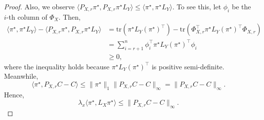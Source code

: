 \documentclass{article}
\theoremstyle{definition}
\begin{document}
\begin{proof}
    Also, we observe $\langle P_{X, r} \pi^\star, P_{X, r} \pi^\star L_Y \rangle \le \langle \pi^\star, \pi^\star L_Y \rangle$. To see this, let $\phi_i$ be the $i$-th column of $\Phi_X$. Then,
    \begin{equation*}
        \begin{split}
            \langle \pi^\star, \pi^\star L_Y \rangle - \langle P_{X, r} \pi^\star, P_{X, r} \pi^\star L_Y \rangle 
            & = \mathrm{tr}(\pi^\star L_Y (\pi^\star)^\top) - \mathrm{tr}(\Phi_{X, r}^\top \pi^\star L_Y (\pi^\star)^\top \Phi_{X, r}) \\
            & = \sum_{i = r + 1}^{n} \phi_i^\top \pi^\star L_Y (\pi^\star)^\top \phi_i \\
            & \ge 0,
        \end{split}
    \end{equation*}
    where the inequality holds because $\pi^\star L_Y (\pi^\star)^\top$ is positive semi-definite. Meanwhile, 
    \begin{equation*}
        \langle \pi^\star, P_{X, r} C - C \rangle \le \|\pi^\star\|_1 \|P_{X, r} C - C\|_\infty = \|P_{X, r} C - C\|_\infty.
    \end{equation*}
    Hence, 
    \begin{equation}
        \label{eq:bound_temporary}
        \lambda_x \langle \pi^\star, L_X \pi^\star \rangle
        \le \|P_{X, r} C - C\|_\infty.
    \end{equation}


\end{proof}
\end{document}
